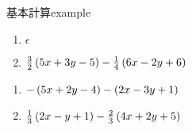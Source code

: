 \documentclass[bwprint,a4paper]{extarticle}
\begin{document}
\begin{question}{基本計算}{example}
	\begin{enumerate}
		\item $\epsilon$
		\item $\frac32\left(5x+3y-5\right)-\frac14\left(6x-2y+6\right)$
	\end{enumerate}
\end{question}
\vspace{15ex}
\begin{observing}
	\begin{enumerate}
		\item $ -\left(5x+2y-4\right)-\left(2x-3y+1\right)$
		\item $ \frac13\left(2x-y+1\right)-\frac23\left(4x+2y+5\right)$
	\end{enumerate}
\end{observing}
\vspace{5ex}
\end{document}

